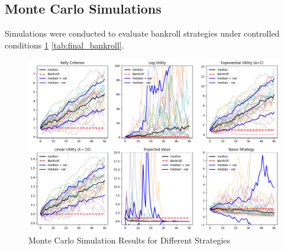 \documentclass[6pt,twocolumn]{article}
\begin{document}
\subsection{Monte Carlo Simulations}
Simulations were conducted to evaluate bankroll strategies under controlled conditions \ref{fig:monte_carlo} \ref{tab:final_bankroll}.

\begin{figure}[h]
    \centering
    \includegraphics[width=\linewidth]{statics/monte_carlo_b=b.png}
    \caption{Monte Carlo Simulation Results for Different Strategies}
    \label{fig:monte_carlo}
\end{figure}

\begin{table}[h]
\centering
{}
\caption{Final Bankroll Statistics from Simulations}
\label{tab:final_bankroll}
\end{table}
\end{document}
